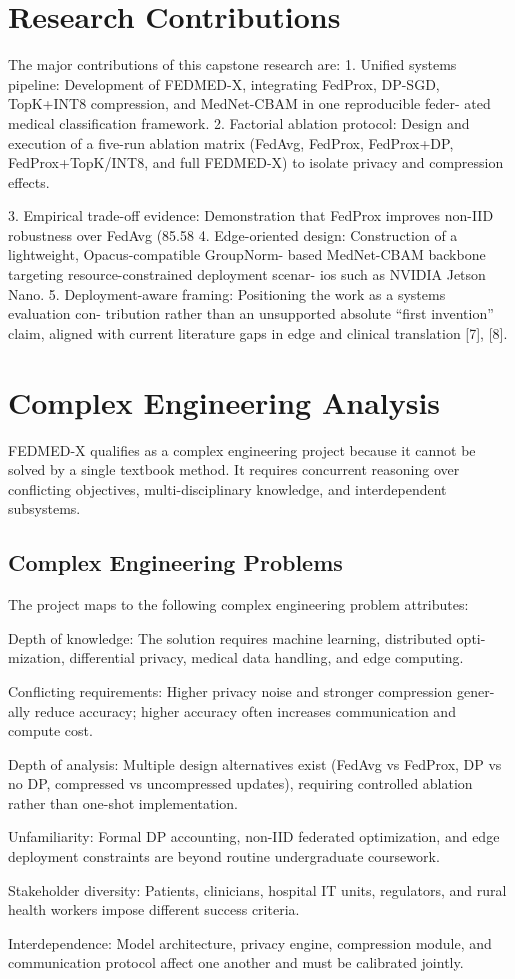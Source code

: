 \section{Research Contributions}
The major contributions of this capstone research are:
1. Unified systems pipeline: Development of FEDMED-X, integrating FedProx,
DP-SGD, TopK+INT8 compression, and MedNet-CBAM in one reproducible feder- ated medical classification framework.
2. Factorial ablation protocol: Design and execution of a five-run ablation matrix (FedAvg, FedProx, FedProx+DP, FedProx+TopK/INT8, and full FEDMED-X) to isolate privacy and compression effects.

3. Empirical trade-off evidence: Demonstration that FedProx improves non-IID robustness over FedAvg (85.58%
4. Edge-oriented design: Construction of a lightweight, Opacus-compatible GroupNorm- based MedNet-CBAM backbone targeting resource-constrained deployment scenar- ios such as NVIDIA Jetson Nano.
5. Deployment-aware framing: Positioning the work as a systems evaluation con- tribution rather than an unsupported absolute “first invention” claim, aligned with current literature gaps in edge and clinical translation [7], [8].
\section{Complex Engineering Analysis}
FEDMED-X qualifies as a complex engineering project because it cannot be solved by a single textbook method. It requires concurrent reasoning over conflicting objectives, multi-disciplinary knowledge, and interdependent subsystems.
\subsection{Complex Engineering Problems}
The project maps to the following complex engineering problem attributes:
\item Depth of knowledge: The solution requires machine learning, distributed opti- mization, differential privacy, medical data handling, and edge computing.
\item Conflicting requirements: Higher privacy noise and stronger compression gener- ally reduce accuracy; higher accuracy often increases communication and compute cost.

\item Depth of analysis: Multiple design alternatives exist (FedAvg vs FedProx, DP vs no DP, compressed vs uncompressed updates), requiring controlled ablation rather than one-shot implementation.
\item Unfamiliarity: Formal DP accounting, non-IID federated optimization, and edge deployment constraints are beyond routine undergraduate coursework.
\item Stakeholder diversity: Patients, clinicians, hospital IT units, regulators, and rural health workers impose different success criteria.
\item Interdependence: Model architecture, privacy engine, compression module, and communication protocol affect one another and must be calibrated jointly.
